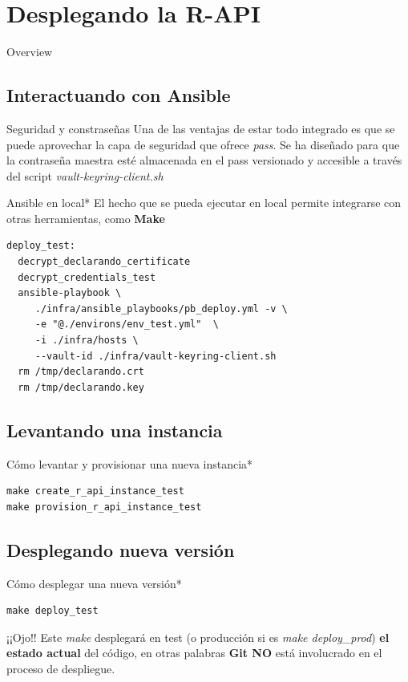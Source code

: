 \documentclass[12pt, aspectratio=169]{beamer} %
\begin{document}
\section{Desplegando la R-API}

\begin{frame}{Overview}
\tableofcontents
\end{frame}


\subsection{Interactuando con Ansible}

\begin{frame}{Seguridad y constraseñas}
  Una de las ventajas de estar todo integrado es que se puede aprovechar la capa de seguridad que ofrece \textit{pass}. Se ha diseñado para que la contraseña maestra esté almacenada en el pass versionado y accesible a través del script \textit{vault-keyring-client.sh}

\end{frame}

\begin{frame}[fragile]{Ansible en local*}
El hecho que se pueda ejecutar en local permite integrarse con otras herramientas, como \textbf{Make}
\begin{verbatim}
deploy_test: 
  decrypt_declarando_certificate
  decrypt_credentials_test
  ansible-playbook \
     ./infra/ansible_playbooks/pb_deploy.yml -v \
     -e "@./environs/env_test.yml"  \
     -i ./infra/hosts \
     --vault-id ./infra/vault-keyring-client.sh
  rm /tmp/declarando.crt
  rm /tmp/declarando.key
\end{verbatim}
\end{frame}


\subsection{Levantando una instancia}
\begin{frame}[fragile]{Cómo levantar y provisionar una nueva instancia*}
\begin{verbatim}
make create_r_api_instance_test 
make provision_r_api_instance_test
\end{verbatim}
\end{frame}



\subsection{Desplegando nueva versión}
\begin{frame}[fragile]{Cómo desplegar una nueva versión*}
\begin{verbatim}
make deploy_test 
\end{verbatim}

  \begin{block}{¡¡Ojo!!}
    Este \textit{make} desplegará en test (o producción si es \textit{make deploy\_prod}) \textbf{el estado actual} del código, en otras palabras \textbf{Git NO} está involucrado en el proceso de despliegue.
  \end{block}

\end{frame}
\end{document}
